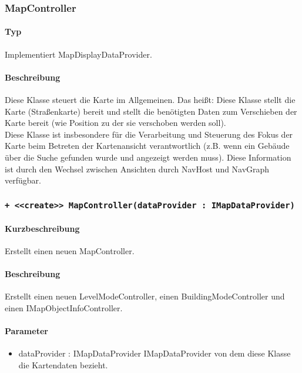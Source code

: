 \subsubsection{MapController}
\paragraph*{Typ}
Implementiert MapDisplayDataProvider.
\paragraph*{Beschreibung}
Diese Klasse steuert die Karte im Allgemeinen. Das heißt: Diese Klasse stellt die Karte (Straßenkarte) bereit 
und stellt die benötigten Daten zum Verschieben der Karte bereit (wie Position zu der sie verschoben werden soll).\\
Diese Klasse ist insbesondere für die Verarbeitung und Steuerung des Fokus der Karte beim Betreten der 
Kartenansicht verantwortlich (z.B. wenn ein Gebäude über die Suche gefunden wurde und angezeigt werden muss).
Diese Information ist durch den Wechsel zwischen Ansichten durch NavHost und NavGraph verfügbar.

\subsubsection*{\texttt{+ <<create>> MapController(dataProvider : IMapDataProvider)}}%
\paragraph*{Kurzbeschreibung}
Erstellt einen neuen MapController.
\paragraph*{Beschreibung}
Erstellt einen neuen LevelModeController, einen BuildingModeController und einen IMapObjectInfoController.
\paragraph*{Parameter}
\begin{itemize}
    \item dataProvider : IMapDataProvider IMapDataProvider von dem diese Klasse die Kartendaten bezieht.
\end{itemize}
